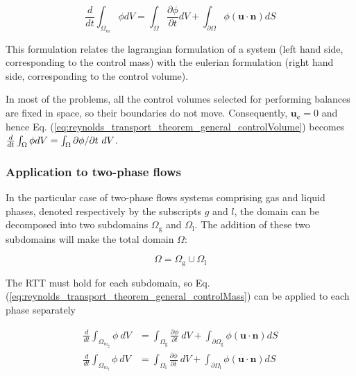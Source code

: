 \begin{equation}
\label{eq:reynolds_transport_theorem_general_controlMass}
\boxed{
\frac{d}{dt} \int_{\Omega_m} \phi  dV = \int_\Omega \frac{\partial \phi}{\partial t} dV + \int_{\partial \Omega} \phi   \left( \boldsymbol{u} \cdot \boldsymbol{n} \right) dS
}
\end{equation}

This formulation relates the lagrangian formulation of a system (left hand side, corresponding to the control mass) with the eulerian formulation (right hand side, corresponding to the control volume). 

In most of the problems, all the control volumes selected for performing balances are fixed in space, so their boundaries do not move. Consequently, $\boldsymbol{u_c} = 0$ and hence Eq. (\ref{eq:reynolds_transport_theorem_general_controlVolume}) becomes $\frac{d}{dt} \int_{\scriptsize{\Omega}} \phi dV =  \int_{\scriptsize{\Omega}} \partial \phi/\partial t ~ dV$.

\subsubsection*{Application to two-phase flows}
	\label{subsec:RTT_applied_to_TPS_with_interface}

In the particular case of two-phase flows systems comprising gas and liquid phases, denoted respectively by the subscripts $g$ and $l$, the domain can be decomposed into two subdomains $\Omega_\mathrm{g}$ and $\Omega_\mathrm{l}$. The addition of these two subdomains will make the total domain $\Omega$:

\begin{equation}
\label{eq:omega_domain_partition}
\Omega = \Omega_\mathrm{g} \cup \Omega_\mathrm{l}
\end{equation}

The RTT must hold for each subdomain, so Eq. (\ref{eq:reynolds_transport_theorem_general_controlMass}) can be applied to each phase separately

\begin{subequations}
\begin{align}
\frac{d}{dt} \int_{\Omega_{m_\mathrm{g}}} \phi ~ dV &=  \int_{\Omega_\mathrm{g}} \frac{\partial \phi}{\partial t} ~ dV + \int_{\partial \Omega_\mathrm{g}} \phi \left( \boldsymbol{u} \cdot \boldsymbol{n} \right) dS\\
\frac{d}{dt} \int_{\Omega_{m_\mathrm{l}}} \phi ~ dV &=  \int_{\Omega_\mathrm{l}} \frac{\partial \phi}{\partial t} ~ dV + \int_{\partial \Omega_\mathrm{l}} \phi \left( \boldsymbol{u} \cdot \boldsymbol{n} \right) dS
\end{align}
\end{subequations}

